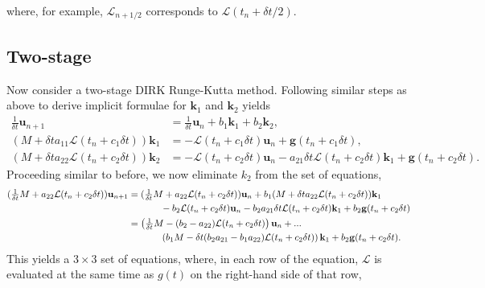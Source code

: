 \documentclass[a4paper,10pt]{article}
\begin{document}
%
where, for example, $\mathcal{L}_{n+1/2}$ corresponds to $\mathcal{L}(t_n + \delta t/2)$.

\subsection{Two-stage}

Now consider a two-stage DIRK Runge-Kutta method. Following similar steps as above to derive implicit
formulae for $\mathbf{k}_1$ and $\mathbf{k}_2$ yields
%
\begin{align*}
\tfrac{1}{\delta t}\mathbf{u}_{n+1} & = \tfrac{1}{\delta t}\mathbf{u}_{n} + b_1\mathbf{k}_1 + b_2\mathbf{k}_2 , \\
(M + \delta t a_{11}\mathcal{L}(t_n+c_1\delta t))\mathbf{k}_1 & = -\mathcal{L}(t_n+c_1\delta t) \mathbf{u}_n + \mathbf{g}(t_n+c_1\delta t), \\
(M + \delta t a_{22}\mathcal{L}(t_n+c_2\delta t))\mathbf{k}_2 & = -\mathcal{L}(t_n+c_2\delta t) \mathbf{u}_n -
	a_{21}\delta t\mathcal{L}(t_n+c_2\delta t) \mathbf{k}_1 + \mathbf{g}(t_n+c_2\delta t). 
\end{align*}
%
Proceeding similar to before, we now eliminate $k_2$ from the set of equations,
%
\begin{align*}
(\tfrac{1}{\delta t}M + a_{22}\mathcal{L}(t_n+c_2\delta t))\mathbf{u}_{n+1} & =
	(\tfrac{1}{\delta t}M + a_{22}\mathcal{L}(t_n+c_2\delta t))\mathbf{u}_{n} + b_1(M + \delta t a_{22}\mathcal{L}(t_n+c_2\delta t))\mathbf{k}_{1}
	\\ & \hspace{8ex}- b_2\mathcal{L}(t_n+c_2\delta t) \mathbf{u}_n - b_2a_{21}\delta t\mathcal{L}(t_n+c_2\delta t) \mathbf{k}_1 + b_2\mathbf{g}(t_n+c_2\delta t) \\
& = \left(\tfrac{1}{\delta t}M - (b_{2} - a_{22}) \mathcal{L}(t_n+c_2\delta t)\right)\mathbf{u}_{n} + ...
	 \\ & \hspace{8ex} \left(b_1M  - \delta t(b_2 a_{21} - b_1a_{22}) \mathcal{L}(t_n+c_2\delta t)\right) \mathbf{k}_1 + b_2\mathbf{g}(t_n+c_2\delta t).
\end{align*}
%
This yields a $3\times 3$ set of equations, where, in each row of the equation, $\mathcal{L}$ is evaluated at the same time
as $g(t)$ on the right-hand side of that row,
%
\end{document}
